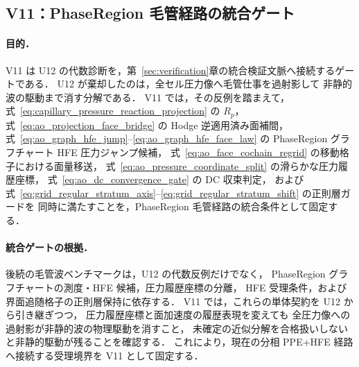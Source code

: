 %
\subsection{V11：PhaseRegion 毛管経路の統合ゲート}
\label{sec:ao_fast_capillary_gate}

\paragraph{目的．}
V11 は U12 の代数診断を，第~\ref{sec:verification}章の統合検証文脈へ接続するゲートである．
U12 が棄却したのは，全セル圧力像へ毛管仕事を過射影して
非静的波の駆動まで消す分解である．
V11 では，その反例を踏まえて，
式~\eqref{eq:capillary_pressure_reaction_projection} の $R_p$，
式~\eqref{eq:ao_projection_face_bridge} の Hodge 逆適用済み面補間，
式~\eqref{eq:ao_graph_hfe_jump}--\eqref{eq:ao_graph_hfe_face_law} の
PhaseRegion グラフチャート HFE 圧力ジャンプ候補，
式~\eqref{eq:ao_face_cochain_regrid} の移動格子における面量移送，
式~\eqref{eq:ao_pressure_coordinate_split} の滑らかな圧力履歴座標，
式~\eqref{eq:ao_dc_convergence_gate} の DC 収束判定，
および式~\eqref{eq:grid_regular_stratum_axis}--\eqref{eq:grid_regular_stratum_shift}
の正則層ガードを
同時に満たすことを，PhaseRegion 毛管経路の統合条件として固定する．

\paragraph{統合ゲートの根拠．}
後続の毛管波ベンチマークは，U12 の代数反例だけでなく，
PhaseRegion グラフチャートの測度・HFE 候補，圧力履歴座標の分離，
HFE 受理条件，および界面追随格子の正則層保持に依存する．
V11 では，これらの単体契約を U12 から引き継ぎつつ，
圧力履歴座標と面加速度の履歴表現を変えても
全圧力像への過射影が非静的波の物理駆動を消すこと，
未確定の近似分解を合格扱いしないと非静的駆動が残ることを確認する．
これにより，現在の分相 PPE+HFE 経路へ接続する受理境界を V11 として固定する．

